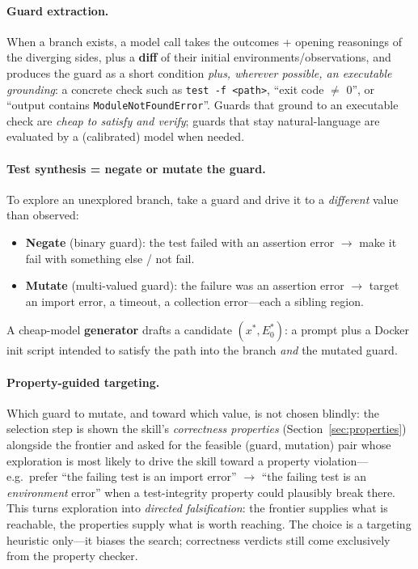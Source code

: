 \documentclass[11pt]{article}
\begin{document}
\paragraph{Guard extraction.} When a branch exists, a model call takes the
outcomes + opening reasonings of the diverging sides, plus a \textbf{diff} of
their initial environments/observations, and produces the guard as a short
condition \emph{plus, wherever possible, an executable grounding}: a concrete
check such as \texttt{test -f <path>}, ``exit code $\ne$ 0'', or ``output
contains \texttt{ModuleNotFoundError}''. Guards that ground to an executable
check are \emph{cheap to satisfy and verify}; guards that stay natural-language
are evaluated by a (calibrated) model when needed.

\paragraph{Test synthesis = negate or mutate the guard.} To explore an
unexplored branch, take a guard and drive it to a \emph{different} value than
observed:
\begin{itemize}[leftmargin=1.5em, itemsep=1pt]
  \item \textbf{Negate} (binary guard): the test failed with an assertion error
  $\to$ make it fail with something else / not fail.
  \item \textbf{Mutate} (multi-valued guard): the failure was an assertion error
  $\to$ target an import error, a timeout, a collection error---each a sibling
  region.
\end{itemize}
A cheap-model \textbf{generator} drafts a candidate $(x^*, E_0^*)$: a prompt plus
a Docker init script intended to satisfy the path into the branch \emph{and} the
mutated guard.

\paragraph{Property-guided targeting.} Which guard to mutate, and toward which
value, is not chosen blindly: the selection step is shown the skill's
\emph{correctness properties} (Section~\ref{sec:properties}) alongside the
frontier and asked for the feasible (guard, mutation) pair whose exploration is
most likely to drive the skill toward a property violation---e.g.\ prefer ``the
failing test is an import error'' $\to$ ``the failing test is an
\emph{environment} error'' when a test-integrity property could plausibly break
there. This turns exploration into \emph{directed falsification}: the frontier
supplies what is reachable, the properties supply what is worth reaching. The
choice is a targeting heuristic only---it biases the search; correctness verdicts
still come exclusively from the property checker.
\end{document}
